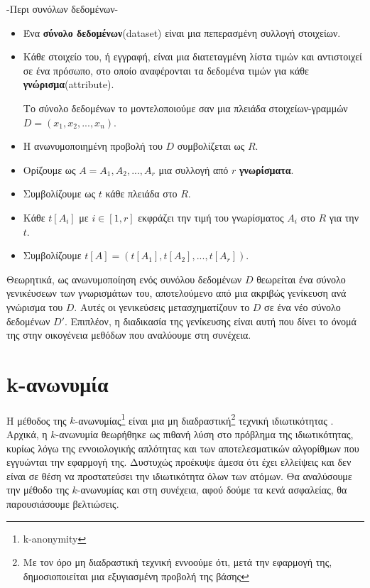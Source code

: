 \begin{definition}-Περι συνόλων δεδομένων-
\begin{itemize}
\item Ένα \textbf{σύνολο δεδομένων}(\textlatin{dataset})  είναι μια πεπερασμένη συλλογή στοιχείων.

\item Κάθε στοιχείο του, ή εγγραφή, είναι μια διατεταγμένη λίστα τιμών και αντιστοιχεί σε ένα πρόσωπο, στο οποίο αναφέρονται τα δεδομένα τιμών για κάθε \textbf{γνώρισμα}(\textlatin{attribute}).

Το σύνολο δεδομένων το μοντελοποιούμε σαν μια πλειάδα στοιχείων-γραμμών $D=(x_1,x_2,...,x_n)$.



\item Η ανωνυμοποιημένη προβολή του $D$ συμβολίζεται ως $R$.
\item Ορίζουμε ως $A=A_1,A_2,...,A_r$ μια συλλογή από $r$ \textbf{γνωρίσματα}.
\item Συμβολίζουμε ως $t$ κάθε πλειάδα στο $R$.
\item Κάθε $t[A_i]$ με $i \in [1,r]$ εκφράζει την τιμή του γνωρίσματος $A_i$ στο $R$ για την $t$.
\item Συμβολίζουμε  $t[A]=(t[A_1],t[A_2],...,t[A_r])$.
\end{itemize}
\end{definition}
Θεωρητικά, ως ανωνυμοποίηση ενός συνόλου δεδομένων $D$ θεωρείται ένα σύνολο γενικέυσεων των γνωρισμάτων του, αποτελούμενο από μια ακριβώς γενίκευση ανά γνώρισμα του $D$. Αυτές οι γενικεύσεις μετασχηματίζουν το $D$ σε ένα νέο σύνολο δεδομένων $D'$. Επιπλέον, η διαδικασία της γενίκευσης είναι αυτή που δίνει το όνομά της στην οικογένεια μεθόδων που αναλύουμε στη συνέχεια.








\section{\textlatin{k}-ανωνυμία}
\label{sec:k}

Η μέθοδος της $k$-ανωνυμίας\footnote{\textlatin{k-anonymity}} είναι μια μη διαδραστική\footnote{Με τον όρο μη διαδραστική τεχνική εννοούμε ότι, μετά την εφαρμογή της, δημοσιοποιείται μια εξυγιασμένη προβολή της βάσης} τεχνική ιδιωτικότητας 
. Αρχικά, η $k$-ανωνυμία θεωρήθηκε ως πιθανή λύση στο πρόβλημα της ιδιωτικότητας, κυρίως λόγω της εννοιολογικής απλότητας και των αποτελεσματικών αλγορίθμων που εγγυώνται την εφαρμογή της. Δυστυχώς προέκυψε άμεσα ότι έχει ελλείψεις και δεν είναι σε θέση να προστατεύσει την ιδιωτικότητα όλων των ατόμων. Θα αναλύσουμε την μέθοδο της $k$-ανωνυμίας και στη συνέχεια, αφού δούμε τα κενά ασφαλείας, θα παρουσιάσουμε βελτιώσεις.

